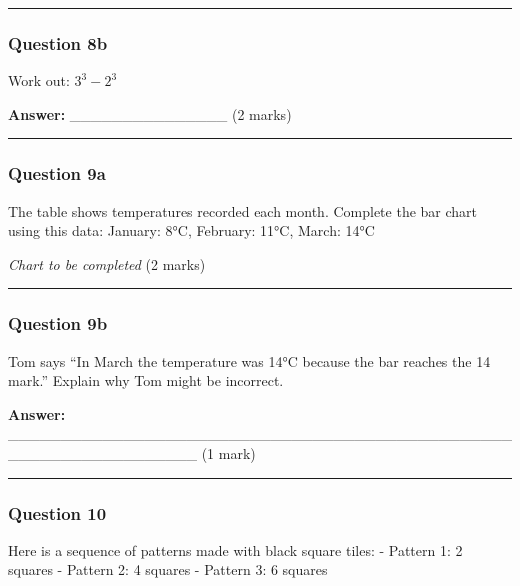 \begin{center}\rule{0.5\linewidth}{0.5pt}\end{center}

\subsubsection{Question 8b}\label{question-8b}

Work out: \(3^3 - 2^3\)

\textbf{Answer:} \_\_\_\_\_\_\_\_\_\_\_\_\_\_\_ (2 marks)

\begin{center}\rule{0.5\linewidth}{0.5pt}\end{center}

\subsubsection{Question 9a}\label{question-9a}

The table shows temperatures recorded each month. Complete the bar chart
using this data: January: 8°C, February: 11°C, March: 14°C

\emph{Chart to be completed} (2 marks)

\begin{center}\rule{0.5\linewidth}{0.5pt}\end{center}

\subsubsection{Question 9b}\label{question-9b}

Tom says ``In March the temperature was 14°C because the bar reaches the
14 mark.'' Explain why Tom might be incorrect.

\textbf{Answer:}
\_\_\_\_\_\_\_\_\_\_\_\_\_\_\_\_\_\_\_\_\_\_\_\_\_\_\_\_\_\_\_\_\_\_\_\_\_\_\_\_\_\_\_\_\_\_\_\_\_\_\_\_\_\_\_\_\_\_\_\_\_\_\_\_\_\_
(1 mark)

\begin{center}\rule{0.5\linewidth}{0.5pt}\end{center}

\subsubsection{Question 10}\label{question-10}

Here is a sequence of patterns made with black square tiles: - Pattern
1: 2 squares - Pattern 2: 4 squares - Pattern 3: 6 squares

